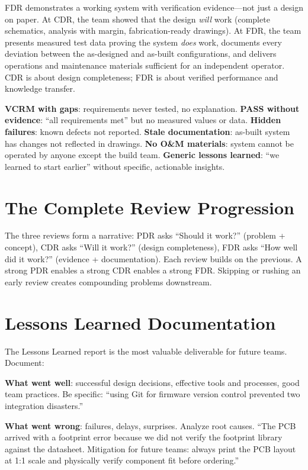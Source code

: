 \begin{tipbox}
FDR demonstrates a working system with verification evidence---not just a design on paper. At CDR, the team showed that the design \emph{will} work (complete schematics, analysis with margin, fabrication-ready drawings). At FDR, the team presents measured test data proving the system \emph{does} work, documents every deviation between the as-designed and as-built configurations, and delivers operations and maintenance materials sufficient for an independent operator. CDR is about design completeness; FDR is about verified performance and knowledge transfer.
\end{tipbox}

\begin{tipbox}
\textbf{VCRM with gaps}: requirements never tested, no explanation. \textbf{PASS without evidence}: ``all requirements met'' but no measured values or data. \textbf{Hidden failures}: known defects not reported. \textbf{Stale documentation}: as-built system has changes not reflected in drawings. \textbf{No O\&M materials}: system cannot be operated by anyone except the build team. \textbf{Generic lessons learned}: ``we learned to start earlier'' without specific, actionable insights.
\end{tipbox}

\section{The Complete Review Progression}
The three reviews form a narrative: PDR asks ``Should it work?'' (problem + concept), CDR asks ``Will it work?'' (design completeness), FDR asks ``How well did it work?'' (evidence + documentation). Each review builds on the previous. A strong PDR enables a strong CDR enables a strong FDR. Skipping or rushing an early review creates compounding problems downstream.

\section{Lessons Learned Documentation}
The Lessons Learned report is the most valuable deliverable for future teams. Document:

\textbf{What went well}: successful design decisions, effective tools and processes, good team practices. Be specific: ``using Git for firmware version control prevented two integration disasters.''

\textbf{What went wrong}: failures, delays, surprises. Analyze root causes. ``The PCB arrived with a footprint error because we did not verify the footprint library against the datasheet. Mitigation for future teams: always print the PCB layout at 1:1 scale and physically verify component fit before ordering.''

